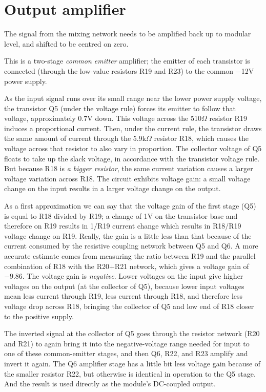 \section{Output amplifier}

The signal from the mixing network needs to be amplified back up to modular
level, and shifted to be centred on zero.

{\centering\par}

This is a two-stage \emph{common emitter} amplifier; the emitter of each
transistor is connected (through the low-value resistors R19 and R23) to the
common $-$12V power supply.

As the input signal runs over its small range near the lower power supply
voltage, the transistor Q5 (under the voltage rule) forces its emitter to
follow that voltage, approximately 0.7V down.  This voltage across the
510$\Omega$ resistor R19 induces a proportional current.  Then, under the
current rule, the transistor draws the same amount of current through the
5.9k$\Omega$ resistor R18, which causes the voltage across that resistor to
also vary in proportion.  The collector voltage of Q5 floats to take up the
slack voltage, in accordance with the transistor voltage rule.  But because
R18 is \emph{a bigger resistor}, the same current variation causes a larger
voltage variation across R18.  The circuit exhibits voltage gain:  a small
voltage change on the input results in a larger voltage change on the
output.

As a first approximation we can say that the voltage gain of the first stage
(Q5) is equal to R18 divided by R19; a change of 1V on the transistor base
and therefore on R19 results in 1$/$R19 current change which results in
R18/R19 voltage change on R19.  Really, the gain is a little less than that
because of the current consumed by the resistive coupling network between Q5
and Q6.  A more accurate estimate comes from measuring the ratio between R19
and the parallel combination of R18 with the R20$+$R21 network, which gives
a voltage gain of $-9.86$.  The voltage gain is \emph{negative}.  Lower
voltages on the input give higher voltages on the output (at the collector
of Q5), because lower input voltages mean less current through R19, less
current through R18, and therefore less voltage drop across R18, bringing
the collector of Q5 and low end of R18 closer to the positive supply.

The inverted signal at the collector of Q5 goes through the resistor network
(R20 and R21) to again bring it into the negative-voltage range needed for
input to one of these common-emitter stages, and then Q6, R22, and R23
amplify and invert it again.  The Q6 amplifier stage has a little bit less
voltage gain because of the smaller resistor R22, but otherwise is identical
in operation to the Q5 stage.  And the result is used directly as the
module's DC-coupled output.

